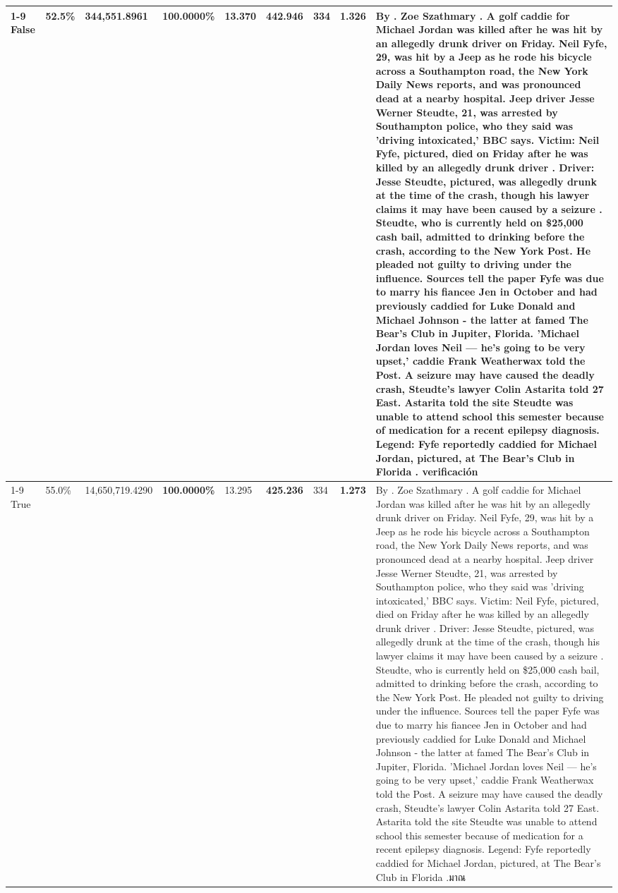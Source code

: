 \begin{table}[H]
\begin{tabular}{lllrlllll}
\cline{1-9}
False & 52.5\% & 344,551.8961 & \bfseries \color{red} 100.0000\% & 13.370 & 442.946 & 334 & 1.326 & By . Zoe Szathmary . A golf caddie for Michael Jordan was killed after he was hit by an allegedly drunk driver on Friday. Neil Fyfe, 29, was hit by a Jeep as he rode his bicycle across a Southampton road, the New York Daily News reports, and was pronounced dead at a nearby hospital. Jeep driver Jesse Werner Steudte, 21, was arrested by Southampton police, who they said was 'driving intoxicated,' BBC says. Victim: Neil Fyfe, pictured, died on Friday after he was killed by an allegedly drunk driver . Driver: Jesse Steudte, pictured, was allegedly drunk at the time of the crash, though his lawyer claims it may have been caused by a seizure . Steudte, who is currently held on \$25,000 cash bail, admitted to drinking before the crash, according to the New York Post. He pleaded not guilty to driving under the influence. Sources tell the paper Fyfe was due to marry his fiancee Jen in October and had previously caddied for Luke Donald and Michael Johnson - the latter at famed The Bear's Club in Jupiter, Florida. 'Michael Jordan loves Neil — he’s going to be very upset,' caddie Frank Weatherwax told the Post. A seizure may have caused the deadly crash, Steudte's lawyer Colin Astarita told 27 East. Astarita told the site Steudte was unable to attend school this semester because of medication for a recent epilepsy diagnosis. Legend: Fyfe reportedly caddied for Michael Jordan, pictured, at The Bear's Club in Florida . verificación \\
\cline{1-9}
True & 55.0\% & 14,650,719.4290 & \bfseries \color{red} 100.0000\% & 13.295 & \bfseries \color{red} 425.236 & 334 & \bfseries \color{red} 1.273 & By . Zoe Szathmary . A golf caddie for Michael Jordan was killed after he was hit by an allegedly drunk driver on Friday. Neil Fyfe, 29, was hit by a Jeep as he rode his bicycle across a Southampton road, the New York Daily News reports, and was pronounced dead at a nearby hospital. Jeep driver Jesse Werner Steudte, 21, was arrested by Southampton police, who they said was 'driving intoxicated,' BBC says. Victim: Neil Fyfe, pictured, died on Friday after he was killed by an allegedly drunk driver . Driver: Jesse Steudte, pictured, was allegedly drunk at the time of the crash, though his lawyer claims it may have been caused by a seizure . Steudte, who is currently held on \$25,000 cash bail, admitted to drinking before the crash, according to the New York Post. He pleaded not guilty to driving under the influence. Sources tell the paper Fyfe was due to marry his fiancee Jen in October and had previously caddied for Luke Donald and Michael Johnson - the latter at famed The Bear's Club in Jupiter, Florida. 'Michael Jordan loves Neil — he’s going to be very upset,' caddie Frank Weatherwax told the Post. A seizure may have caused the deadly crash, Steudte's lawyer Colin Astarita told 27 East. Astarita told the site Steudte was unable to attend school this semester because of medication for a recent epilepsy diagnosis. Legend: Fyfe reportedly caddied for Michael Jordan, pictured, at The Bear's Club in Florida .มาณ \\

\end{tabular}
\end{table}
